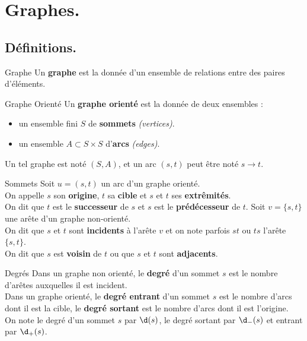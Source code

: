 \documentclass[french, 11pt]{article}
\begin{document}


\section{Graphes.}
\subsection{Définitions.}

\begin{defi}{Graphe}{}
    Un \textbf{graphe} est la donnée d'un ensemble de relations entre des paires d'éléments.
\end{defi}

\begin{defi}{Graphe Orienté}{}
    Un \textbf{graphe orienté} est la donnée de deux ensembles :
    \begin{itemize}[topsep=0pt,itemsep=-0.9 ex]
        \item un ensemble fini $S$ de \textbf{sommets} \textit{(vertices)}.
        \item un ensemble $A\subset S\times S$ d'\textbf{arcs} \textit{(edges)}.
    \end{itemize}
    Un tel graphe est noté $(S,A)$, et un arc $(s,t)$ peut être noté $s\to t$.
\end{defi}

\begin{nota}{Sommets}{}
    Soit $u=(s,t)$ un arc d'un graphe orienté.\\
    On appelle $s$ son \textbf{origine}, $t$ sa \textbf{cible} et $s$ et $t$ ses \textbf{extrêmités}.\\
    On dit que $t$ est le \textbf{successeur} de $s$ et $s$ est le \textbf{prédécesseur} de $t$.\n
    Soit $v=\{s,t\}$ une arête d'un graphe non-orienté.\\
    On dit que $s$ et $t$ sont \textbf{incidents} à l'arête $v$ et on note parfois $st$ ou $ts$ l'arête $\{s,t\}$.\\
    On dit que $s$ est \textbf{voisin} de $t$ ou que $s$ et $t$ sont \textbf{adjacents}.
\end{nota}

\begin{defi}{Degrés}{}
    Dans un graphe non orienté, le \textbf{degré} d'un sommet $s$ est le nombre d'arêtes auxquelles il est incident.\\
    Dans un graphe orienté, le \textbf{degré entrant} d'un sommet $s$ est le nombre d'arcs dont il est la cible, le \textbf{degré sortant} est le nombre d'arcs dont il est l'origine.\\
    On note le degré d'un sommet $s$ par $\d(s)$, le degré sortant par $\d_-(s)$ et entrant par $\d_+(s)$.
\end{defi}
\end{document}
